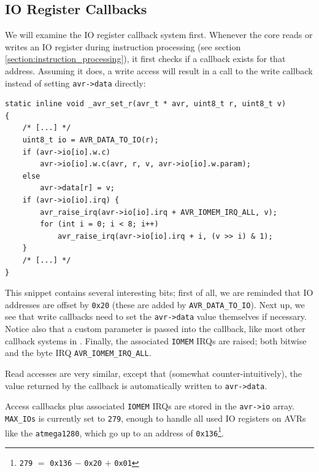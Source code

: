 \subsection{\acf{IO} Register Callbacks} \label{subsection:io_register_callbacks}

We will examine the \ac{IO} register callback system first. Whenever the \simavr
core reads or writes an \ac{IO} register during instruction processing (see section
\ref{section:instruction_processing}), it first checks if a callback exists for
that address. Assuming it does, a write access will result in a call to the
write callback instead of setting \lstinline|avr->data| directly:

\begin{lstlisting}
static inline void _avr_set_r(avr_t * avr, uint8_t r, uint8_t v)
{
    /* [...] */
    uint8_t io = AVR_DATA_TO_IO(r);
    if (avr->io[io].w.c)
        avr->io[io].w.c(avr, r, v, avr->io[io].w.param);
    else
        avr->data[r] = v;
    if (avr->io[io].irq) {
        avr_raise_irq(avr->io[io].irq + AVR_IOMEM_IRQ_ALL, v);
        for (int i = 0; i < 8; i++)
            avr_raise_irq(avr->io[io].irq + i, (v >> i) & 1);
    }
    /* [...] */
}
\end{lstlisting}

This snippet contains several interesting bits; first of all, we are reminded that \ac{IO}
addresses are offset by \lstinline|0x20| (these are added by \lstinline|AVR_DATA_TO_IO|).
Next up, we see that write callbacks need to set the \lstinline|avr->data| value
themselves if necessary. Notice also that a custom parameter is passed into the callback,
like most other callback systems in \simavr. Finally, the associated \lstinline|IOMEM| \acp{IRQ} are
raised; both bitwise and the byte \ac{IRQ} \lstinline|AVR_IOMEM_IRQ_ALL|.

Read accesses are very similar, except that (somewhat counter-intuitively), the value returned
by the callback is automatically written to \lstinline|avr->data|.

Access callbacks plus associated \lstinline|IOMEM| \acp{IRQ} are stored
in the \lstinline|avr->io| array. \lstinline|MAX_IOs| is currently set to
\lstinline|279|, enough to handle all used \ac{IO} registers on \acp{AVR} like
the \verb|atmega1280|, which go up to an address of \lstinline|0x136|\footnote{
\lstinline|279| $=$ \lstinline|0x136| $-$ \lstinline|0x20| $+$ \lstinline|0x01|}.

